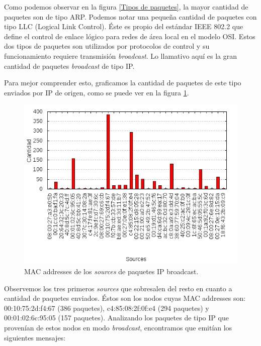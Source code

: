 Como podemos observar en la figura \ref{Tipos de paquetes}, la mayor cantidad de paquetes son de tipo ARP. Podemos notar una pequeña cantidad de paquetes con tipo LLC (Logical Link Control). Éste es propio del estándar IEEE 802.2 que define el control de enlace l\'ogico para redes de \'area local en el modelo OSI. Estos dos tipos de paquetes son utilizados por protocolos de control y su funcionamiento requiere transmisión \textit{broadcast}. Lo llamativo aqu\'i es la gran cantidad de paquetes \textit{broadcast} de tipo IP.

Para mejor comprender esto, graficamos la cantidad de paquetes de este tipo enviados por IP de origen, como se puede ver en la figura \ref{Sources de paquetes IP broadcast}.

\begin{figure}[ht]
    \centering
    \includegraphics[scale=0.7]{figuras/experimento2-ips-origen.png}
    \caption{MAC addresses de los \textit{sources} de paquetes IP broadcast.}\label{Sources de paquetes IP broadcast}
\end{figure}

Observemos los tres primeros \textit{sources} que sobresalen del resto en cuanto a cantidad de paquetes enviados. Éstos son los nodos cuyas MAC addresses son: 00:10:75:2d:f4:67 (386 paquetes), c4:85:08:2f:0f:e4 (294 paquetes) y 00:01:02:6c:95:05 (157 paquetes).
Analizando los paquetes de tipo IP que provenían de estos nodos en modo \textit{broadcast}, encontramos que emitían los siguientes mensajes:

